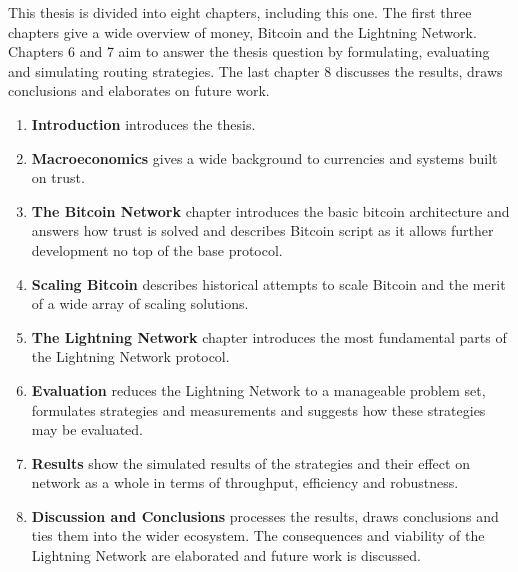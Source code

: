 This thesis is divided into eight chapters, including this one. The first three chapters give a wide overview of money, Bitcoin and the \gls{Lightning Network}. Chapters 6 and 7 aim to answer the thesis question by formulating, evaluating and simulating routing strategies. The last chapter 8 discusses the results, draws conclusions and elaborates on future work.

\begin{enumerate}
	\item \textbf{Introduction} introduces the thesis.
	\item \textbf{Macroeconomics} gives a wide background to currencies and systems built on trust. 
	\item \textbf{The Bitcoin Network} chapter introduces the basic \gls{bitcoin} architecture and answers how trust is solved and describes Bitcoin script as it allows further development no top of the base protocol.
	\item \textbf{Scaling Bitcoin} describes historical attempts to scale Bitcoin and the merit of a wide array of scaling solutions.
	\item \textbf{The \gls{Lightning Network}} chapter introduces the most fundamental parts of the Lightning Network protocol.
	\item \textbf{Evaluation} reduces the Lightning Network to a manageable problem set, formulates strategies and measurements and suggests how these strategies may be evaluated.
	\item \textbf{Results} show the simulated results of the strategies and their effect on network as a whole in terms of throughput, efficiency and robustness.
	\item \textbf{Discussion and Conclusions} processes the results, draws conclusions and ties them into the wider ecosystem. The consequences and viability of the Lightning Network are elaborated and future work is discussed.
\end{enumerate}